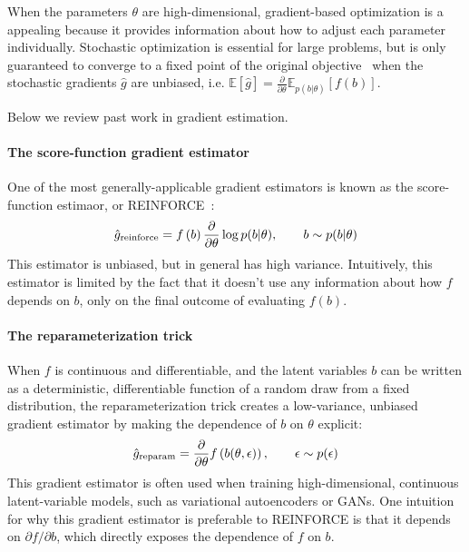 \documentclass{article}
\newcommand{\PT}{\frac{\partial}{\partial \theta}}
\begin{document}
When the parameters $\theta$ are high-dimensional, gradient-based optimization is a appealing because it provides information about how to adjust each parameter individually.
Stochastic optimization is essential for large problems, but is only guaranteed to converge to a fixed point of the original objective~\citep{robbins1951stochastic} when the stochastic gradients $\hat g$ are unbiased, i.e. ${\mathbb{E} \left[ \hat g \right] = \PT \mathbb{E}_{p(b|\theta)} \left[ f(b) \right]}$.

Below we review past work in gradient estimation.

\paragraph{The score-function gradient estimator}
One of the most generally-applicable gradient estimators is known as the score-function estimaor, or REINFORCE~\citep{williams1992simple}:
%
\begin{align}
\hat g_\textnormal{reinforce} =  f \left( b \right) \PT \log p(b | \theta), \qquad b \sim p(b | \theta)
\end{align}
%
This estimator is unbiased, but in general has high variance.
Intuitively, this estimator is limited by the fact that it doesn't use any information about how $f$ depends on $b$, only on the final outcome of evaluating $f(b)$.

\paragraph{The reparameterization trick}
When $f$ is continuous and differentiable, and the latent variables $b$ can be written as a deterministic, differentiable function of a random draw from a fixed distribution, the reparameterization trick \citep{williams1992simple, kingma2013autoencoding, rezende2014stochastic} creates a low-variance, unbiased gradient estimator by making the dependence of $b$ on $\theta$ explicit:
%
\begin{align}
\hat g_\textnormal{reparam} = \PT f \left( b(\theta, \epsilon) \right), \qquad \epsilon \sim p(\epsilon)
\end{align}
%
This gradient estimator is often used when training high-dimensional, continuous latent-variable models, such as variational autoencoders or GANs.
One intuition for why this gradient estimator is preferable to REINFORCE is that it depends on $\partial f / \partial b$, which directly exposes the dependence of $f$ on $b$.
\end{document}
